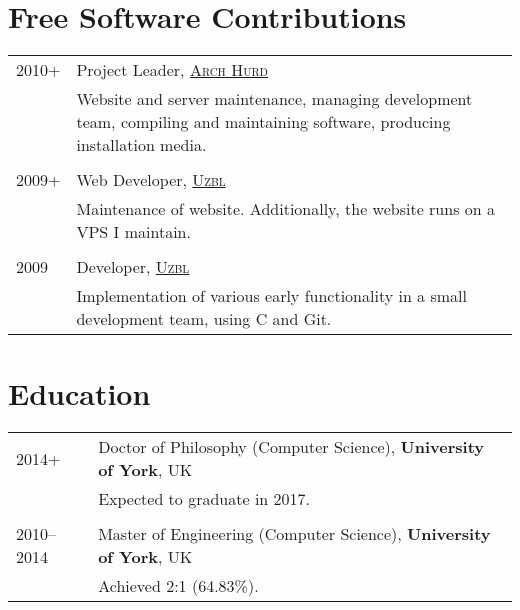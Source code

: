 \documentclass[a4paper,10pt]{article}
\newcommand{\schref}[2]{\href{#1}{\textsc{#2}}}
\newenvironment{cvtable}{\begin{tabular}{x{2cm}|p{11.6cm}}}{\end{tabular}}
\newcommand{\when}[1]{\heading{#1}}
\newcommand{\heading}[1]{\textsc{#1} &}
\newcommand{\detail}[1]{& \footnotesize{#1}}
\begin{document}
\section{Free Software Contributions}
\begin{cvtable}
  \when{2010+} Project Leader, \schref{http://www.archhurd.org}{Arch Hurd}\\
  \detail{Website and server maintenance, managing development team, compiling and maintaining software, producing installation media.}\\\\

  \when{2009+} Web Developer, \schref{http://www.uzbl.org}{Uzbl}\\
  \detail{Maintenance of website. Additionally, the website runs on a VPS I maintain.}\\\\


  \when{2009}  Developer, \schref{http://www.uzbl.org}{Uzbl}\\
  \detail{Implementation of various early functionality in a small development team, using C and Git.}
\end{cvtable}

\section{Education}
\begin{cvtable}
  \when{2014+} Doctor of Philosophy (Computer Science), \textbf{University of York}, UK\\
  \detail{Expected to graduate in 2017.}\\\\

  \when{2010--2014} Master of Engineering (Computer Science), \textbf{University of York}, UK\\
  \detail{Achieved 2:1 (64.83\%).}


\end{cvtable}
\end{document}
